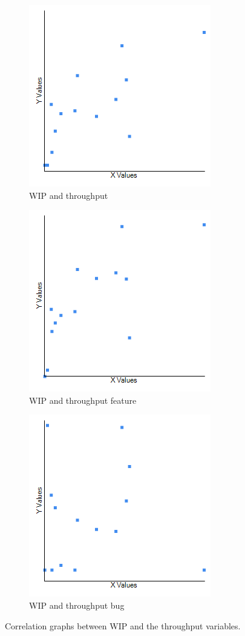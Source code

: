 \documentclass[UKenglish]{ifimaster}  %
\begin{document}
\begin{figure}[h] 
  \begin{subfigure}[b]{0.3\textwidth}
  \center
\includegraphics[scale=0.5]{Picture/One/WIPvsTP.png}
 \caption{WIP and throughput} 
 \label{fig:a:1}
  \end{subfigure}
  \begin{subfigure}[b]{0.3\textwidth}
    \center
\includegraphics[scale=0.5]{Picture/One/WIPvsTPFT.png}
 \caption{WIP and throughput feature} 
\label{fig:b:1}
  \end{subfigure}
  \begin{subfigure}[b]{0.3\textwidth}
    \center
\includegraphics[scale=0.5]{Picture/One/WIPvsTPB.png}
 \caption{WIP and throughput bug} 
\label{fig:c:1}
  \end{subfigure}
\caption{Correlation graphs between WIP and the throughput variables.}
\label{corr:Difference:1}
\end{figure}
\end{document}
